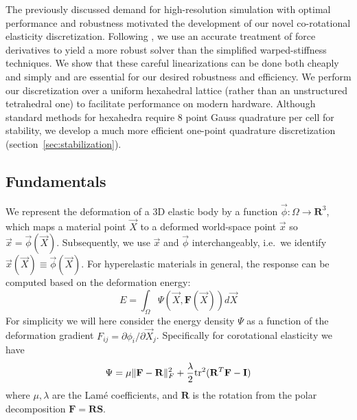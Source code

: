 The previously discussed demand for high-resolution simulation with optimal
performance and robustness motivated the development of our novel co-rotational
elasticity discretization. Following \cite{Chao:2010:SGM}, we use an accurate
treatment of force derivatives to yield a more robust solver than the
simplified warped-stiffness techniques. We show that these careful
linearizations can be done both cheaply and simply and are essential for our desired
robustness and efficiency. We perform our discretization over a
uniform hexahedral lattice  (rather than an unstructured tetrahedral one) to
facilitate performance on modern hardware. Although standard methods for
hexahedra require 8 point Gauss quadrature per cell for stability, we develop a
much more efficient one-point quadrature discretization
(section~\ref{sec:stabilization}).

\subsection{Fundamentals}
\label{sec:fundamentals}

We represent the deformation of a 3D elastic body by a function $\vec{\phi}:\Omega\rightarrow\mathbf{R}^3$, which maps a material point
$\vec{X}$ to a deformed world-space point $\vec{x}$ so $\vec{x}=\vec{\phi}(\vec{X})$. Subsequently, we use $\vec{x}$ and $\vec{\phi}$ interchangeably,
i.e.\ we identify $\vec{x}(\vec{X})\equiv\vec{\phi}(\vec{X})$. For hyperelastic
materials in general, the response can be computed based on the deformation energy:
\begin{equation}
E=\int_\Omega\Psi(\vec{X},\mathbf{F}(\vec{X}))d\vec{X}
\label{eqn_energy_integral}
\end{equation}
For simplicity we will here consider the energy density $\Psi$ as a function of the
deformation gradient $F_{ij}=\partial\phi_i/\partial\vec{X}_j$. Specifically for
corotational elasticity we have
\begin{equation}
\Psi=\mu\|\mathbf{F}-\mathbf{R}\|_F^2+\frac{\lambda}{2}\mbox{tr}^2(\mathbf{R}^T\mathbf{F}-\mathbf{I})
\label{eqn_energy_F}
\end{equation}
where $\mu,\lambda$ are the Lam\'{e} coefficients, and $\mathbf{R}$ is the rotation from the polar decomposition $\mathbf{F}=\mathbf{RS}$.

